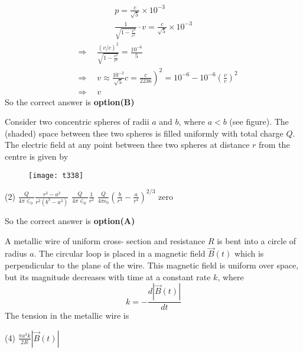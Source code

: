 \begin{questions}
\begin{answer}
	$$
	\begin{array}{r}
	p=\frac{c}{\sqrt{5}} \times 10^{-3} \\
	\frac{1}{\sqrt{1-\frac{v^{2}}{c^{2}}}} \cdot v=\frac{c}{\sqrt{5}} \times 10^{-3}
	\end{array}
	$$
	$$
	\begin{aligned}
	&\Rightarrow \quad \frac{(v / c)^{2}}{\sqrt{1-\frac{v^{2}}{c^{2}}}}=\frac{10^{-6}}{5} \\
	&\left.\Rightarrow \quad v \approx \frac{10^{-3}}{\sqrt{5}} c=\frac{c}{2236}\right)^{2}=10^{-6}-10^{-6}\left(\frac{v}{c}\right)^{2} \\
	&\Rightarrow \quad v
	\end{aligned}
	$$
	So the correct answer is \textbf{option(B)}
\end{answer}
\begin{minipage}{\textwidth}
	\question Consider two concentric spheres of radii $a$ and $b$, where $a<b$ (see figure). The (shaded) space between thee two spheres is filled uniformly with total charge $Q$. The electric field at any point between thee two spheres at distance $r$ from the centre is given by
\end{minipage}
\begin{figure}[H]
	\centering
	\texttt{[image: t338]}
\end{figure}
\begin{tasks}(2)
	\task[\textbf{A.}] $\frac{Q}{4 \pi \in_{0}} \frac{r^{3}-a^{3}}{r^{2}\left(b^{3}-a^{3}\right)}$
	\task[\textbf{B.}] $\frac{Q}{4 \pi \in_{0}} \frac{1}{r^{2}}$
	\task[\textbf{C.}]   $\frac{Q}{4 \pi \epsilon_{0}}\left(\frac{b}{r^{4}}-\frac{a}{r^{4}}\right)^{2 / 3}$
	\task[\textbf{D.}]   zero
\end{tasks}
\begin{answer}
		So the correct answer is \textbf{option(A)}
\end{answer}
\begin{minipage}{\textwidth}
	\question A metallic wire of uniform cross- section and resistance $R$ is bent into a circle of radius $a$. The circular loop is placed in a magnetic field $\vec{B}(t)$ which is perpendicular to the plane of the wire. This magnetic field is uniform over space, but its magnitude decreases with time at a constant rate $k$, where
	$$
	k=-\frac{d|\vec{B}(t)|}{d t}
	$$
	The tension in the metallic wire is
\end{minipage}
\begin{tasks}(4)
	\task[\textbf{A.}]   $\frac{\pi a^{3} k}{2 R}|\vec{B}(t)|$

\end{tasks}
\end{questions}
